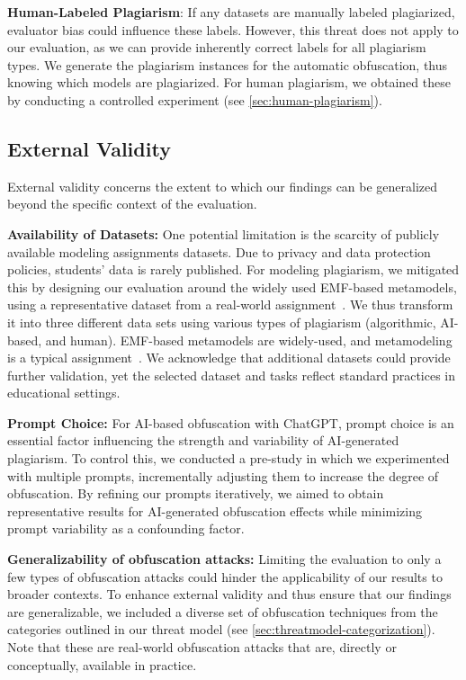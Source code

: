     \textbf{Human-Labeled Plagiarism}: If any datasets are manually labeled plagiarized, evaluator bias could influence these labels.
    However, this threat does not apply to our evaluation, as we can provide inherently correct labels for all plagiarism types.
    We generate the plagiarism instances for the automatic obfuscation, thus knowing which models are plagiarized.
    For human plagiarism, we obtained these by conducting a controlled experiment (see \autoref{sec:human-plagiarism}).

\subsection{External Validity}
External validity concerns the extent to which our findings can be generalized beyond the specific context of the evaluation. 

    \textbf{Availability of Datasets:} One potential limitation is the scarcity of publicly available modeling assignments datasets. Due to privacy and data protection policies, students' data is rarely published. For modeling plagiarism, we mitigated this by designing our evaluation around the widely used EMF-based metamodels, using a representative dataset from a real-world assignment~\cite{Saglam2023}.
    We thus transform it into three different data sets using various types of plagiarism (algorithmic, AI-based, and human).
    EMF-based metamodels are widely-used, and metamodeling is a typical assignment~\cite{Ciccozzi2018}.
    We acknowledge that additional datasets could provide further validation, yet the selected dataset and tasks reflect standard practices in educational settings.


    \textbf{Prompt Choice:} For AI-based obfuscation with ChatGPT, prompt choice is an essential factor influencing the strength and variability of AI-generated plagiarism. To control this, we conducted a pre-study in which we experimented with multiple prompts, incrementally adjusting them to increase the degree of obfuscation. By refining our prompts iteratively, we aimed to obtain representative results for AI-generated obfuscation effects while minimizing prompt variability as a confounding factor.

    \textbf{Generalizability of obfuscation attacks:}
    Limiting the evaluation to only a few types of obfuscation attacks could hinder the applicability of our results to broader contexts. To enhance external validity and thus ensure that our findings are generalizable, we included a diverse set of obfuscation techniques from the categories outlined in our threat model (see \autoref{sec:threatmodel-categorization}). Note that these are real-world obfuscation attacks that are, directly or conceptually, available in practice.

